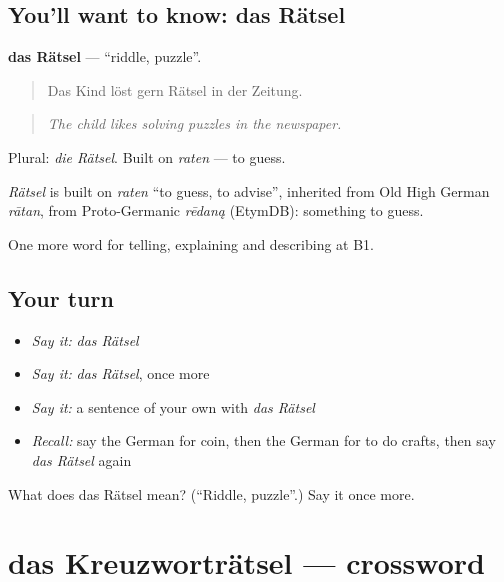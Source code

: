 \subsection*{You'll want to know: das Rätsel}
\textbf{das Rätsel} — \textquotedblleft{}riddle, puzzle\textquotedblright{}.

\begin{quote}
Das Kind löst gern Rätsel in der Zeitung.
\end{quote}

\begin{quote}
\emph{The child likes solving puzzles in the newspaper.}
\end{quote}

Plural: \emph{die Rätsel}. Built on \emph{raten} — to guess.

\begin{cousinweb}
\emph{Rätsel} is built on \emph{raten} \textquotedblleft{}to guess, to advise\textquotedblright{}, inherited from Old High German \emph{rātan}, from Proto-Germanic \emph{rēdaną} (EtymDB): something to guess.
\end{cousinweb}

\begin{grammarlens}[title={What you've built}]
One more word for telling, explaining and describing at B1.
\end{grammarlens}

\subsection*{Your turn}
\begin{itemize}
\raggedright
  \item \emph{Say it:} \emph{das Rätsel}
  \item \emph{Say it:} \emph{das Rätsel}, once more
  \item \emph{Say it:} a sentence of your own with \emph{das Rätsel}
  \item \emph{Recall:} say the German for coin, then the German for to do crafts, then say \emph{das Rätsel} again
\end{itemize}

\begin{tcolorbox}[breakable,colback=teal!4,colframe=teal!35!black,title={Before you move on}]
What does das Rätsel mean? (\textquotedblleft{}Riddle, puzzle\textquotedblright{}.) Say it once more.
\end{tcolorbox}
\section[das Kreuzworträtsel]{das Kreuzworträtsel — crossword}

